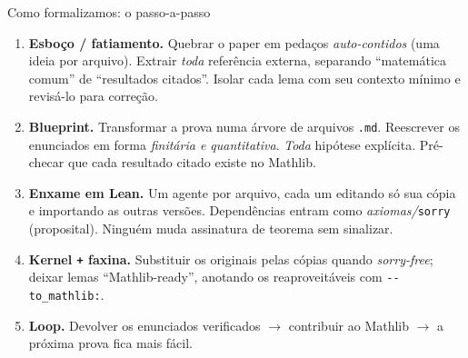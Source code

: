\documentclass[10pt,aspectratio=169]{beamer}
\newcommand{\hl}[1]{{\color{accent}\textbf{#1}}}
\newcommand{\hlb}[1]{{\color{accent2}\textbf{#1}}}
\newcommand{\hlo}[1]{{\color{accent3}\textbf{#1}}}
\newcommand{\hlp}[1]{{\color{accent4}\textbf{#1}}}
\begin{document}
\begin{frame}{Como formalizamos: o passo-a-passo}
  \begin{enumerate}\small
    \setlength{\itemsep}{0.5em}
    \item \hl{Esboço / fatiamento.} Quebrar o paper em pedaços
          \emph{auto-contidos} (uma ideia por arquivo). Extrair
          \emph{toda} referência externa, separando ``matemática
          comum'' de ``resultados citados''. Isolar cada lema com seu
          contexto mínimo e revisá-lo para correção.
    \pause
    \item \hlb{Blueprint.} Transformar a prova numa árvore de arquivos
          \texttt{.md}. Reescrever
          os enunciados em forma \emph{finitária e quantitativa}. \emph{Toda} hipótese explícita.
          Pré-checar que cada resultado citado existe no Mathlib.
    \pause
    \item \hlo{Enxame em Lean.} Um agente por arquivo, cada um editando
          só sua cópia e importando as outras versões.
          Dependências entram como \emph{axiomas/}\texttt{sorry}
          (proposital). Ninguém muda assinatura de teorema sem sinalizar.
    \pause
    \item \hlp{Kernel \texttt{+} faxina.} Substituir os originais pelas cópias quando \emph{sorry-free};
          deixar lemas ``Mathlib-ready'', anotando os reaproveitáveis
          com \texttt{-{}- to\_mathlib:}.
    \pause
    \item \hl{Loop.} Devolver os enunciados verificados $\to$ contribuir
          ao Mathlib $\to$ a próxima prova fica mais fácil.
  \end{enumerate}
\end{frame}
\end{document}
